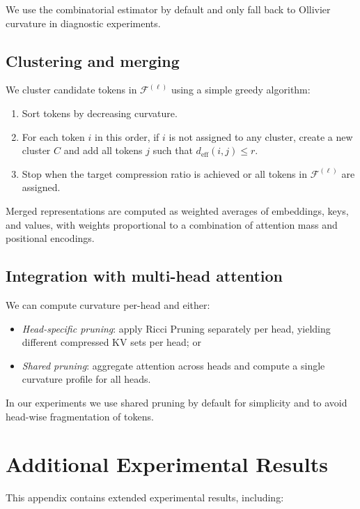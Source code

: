 \documentclass{article}
\theoremstyle{plain}
\theoremstyle{definition}
\theoremstyle{remark}
\newcommand{\cF}{\mathcal{F}}
\begin{document}
We use the combinatorial estimator by default and only fall back to Ollivier curvature in diagnostic experiments.

\subsection{Clustering and merging}

We cluster candidate tokens in $\cF^{(\ell)}$ using a simple greedy algorithm:

\begin{enumerate}
  \item Sort tokens by decreasing curvature.
  \item For each token $i$ in this order, if $i$ is not assigned to any cluster, create a new cluster $C$ and add all tokens $j$ such that $d_\mathrm{eff}(i,j) \le r$.
  \item Stop when the target compression ratio is achieved or all tokens in $\cF^{(\ell)}$ are assigned.
\end{enumerate}

Merged representations are computed as weighted averages of embeddings, keys, and values, with weights proportional to a combination of attention mass and positional encodings.

\subsection{Integration with multi-head attention}

We can compute curvature per-head and either:

\begin{itemize}
  \item \emph{Head-specific pruning}: apply Ricci Pruning separately per head, yielding different compressed KV sets per head; or
  \item \emph{Shared pruning}: aggregate attention across heads and compute a single curvature profile for all heads.
\end{itemize}

In our experiments we use shared pruning by default for simplicity and to avoid head-wise fragmentation of tokens.

\section{Additional Experimental Results}
\label{app:extra-experiments}

This appendix contains extended experimental results, including:
\end{document}
